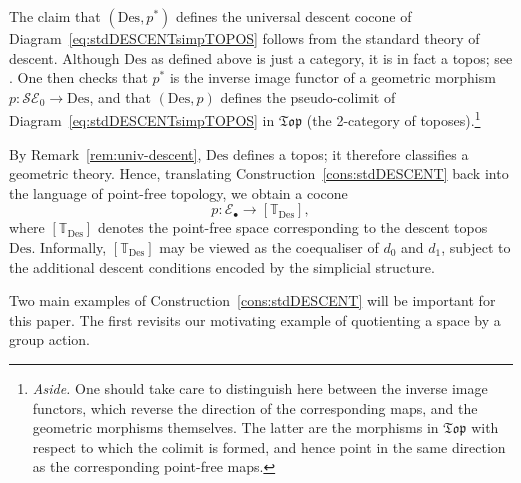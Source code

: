 \documentclass[a4paper, 11pt,reqno]{amsart}
\newcommand{\calS}{\mathcal{S}}
\newcommand{\thT}{\mathbb{T}}
\newcommand{\Des}{\mathrm{Des}}
\newcommand{\E}{\mathcal{E}}
\begin{document}
\begin{remark}\label{rem:univ-descent} The claim that $(\Des,p^*)$ defines the universal descent cocone of Diagram~\eqref{eq:stdDESCENTsimpTOPOS} follows from the standard theory of descent. Although $\Des$ as defined above is just a category, it is in fact a topos; see \cite[\S 3]{Moerdijk}. One then checks that $p^*$ is the inverse image functor of a geometric morphism $p\colon \calS\E_0\to \Des$, and that $(\Des,p)$ defines the  pseudo-colimit of Diagram~\eqref{eq:stdDESCENTsimpTOPOS} in $\mathfrak{Top}$ (the 2-category of toposes).\footnote{{\em Aside.} One should take care to distinguish here between the inverse image functors, which reverse the direction of the corresponding maps, and the geometric morphisms themselves. The latter are the morphisms in $\mathfrak{Top}$ with respect to which the colimit is formed, and hence point in the same direction as the corresponding point-free maps.} 
\end{remark}

\begin{remark} By Remark~\ref{rem:univ-descent}, $\Des$ defines a topos; it therefore classifies a geometric theory. Hence, translating Construction~\ref{cons:stdDESCENT} back into the language of point-free topology, we obtain a cocone 
	\begin{equation}
	p\colon \mathcal{E}_{\bullet}\longrightarrow [\thT_{\Des}],
	\end{equation}
	where $[\thT_\Des]$ denotes the point-free space corresponding to the descent topos $\Des$. Informally, $[\thT_{\Des}]$ may be viewed as the coequaliser of $d_0$ and $d_1$, subject to the additional descent conditions encoded by the simplicial structure.
	
\end{remark}


Two main examples of Construction~\ref{cons:stdDESCENT} will be important for this paper. The first revisits our motivating example of quotienting a space by a group action.
\end{document}
